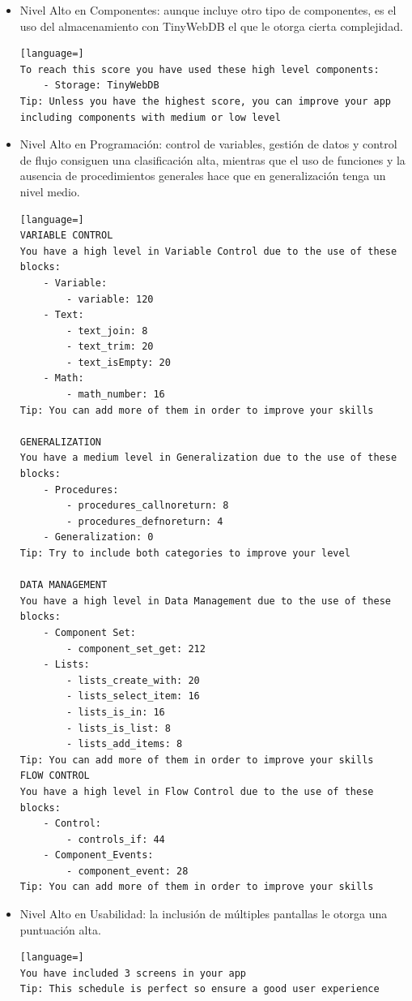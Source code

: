 \documentclass[a4paper, 12pt]{book}
\begin{document}
\begin{itemize}
  \item Nivel Alto en Componentes: aunque incluye otro tipo de componentes, es el uso del almacenamiento con TinyWebDB el que le otorga cierta complejidad.
\begin{lstlisting}[language=]
To reach this score you have used these high level components:
    - Storage: TinyWebDB
Tip: Unless you have the highest score, you can improve your app including components with medium or low level
\end{lstlisting}
  \item Nivel Alto en Programación: control de variables, gestión de datos y control de flujo consiguen una clasificación alta, mientras que el uso de funciones y la ausencia de procedimientos generales hace que en generalización tenga un nivel medio. 
\begin{lstlisting}[language=]
VARIABLE CONTROL
You have a high level in Variable Control due to the use of these blocks:
    - Variable:
        - variable: 120
    - Text:
        - text_join: 8
        - text_trim: 20
        - text_isEmpty: 20
    - Math:
        - math_number: 16
Tip: You can add more of them in order to improve your skills

GENERALIZATION
You have a medium level in Generalization due to the use of these blocks:
    - Procedures:
        - procedures_callnoreturn: 8
        - procedures_defnoreturn: 4
    - Generalization: 0
Tip: Try to include both categories to improve your level

DATA MANAGEMENT
You have a high level in Data Management due to the use of these blocks:
    - Component Set:
        - component_set_get: 212
    - Lists:
        - lists_create_with: 20
        - lists_select_item: 16
        - lists_is_in: 16
        - lists_is_list: 8
        - lists_add_items: 8
Tip: You can add more of them in order to improve your skills
FLOW CONTROL 
You have a high level in Flow Control due to the use of these blocks:
    - Control:
        - controls_if: 44
    - Component_Events:
        - component_event: 28
Tip: You can add more of them in order to improve your skills
\end{lstlisting}
  \item Nivel Alto en Usabilidad: la inclusión de múltiples pantallas le otorga una puntuación alta. 
\begin{lstlisting}[language=]
You have included 3 screens in your app
Tip: This schedule is perfect so ensure a good user experience 
\end{lstlisting}
\end{itemize}
\end{document}
